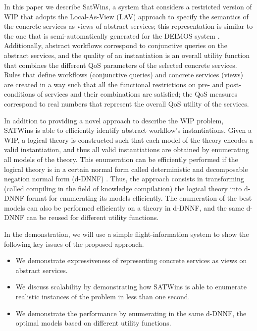 \documentclass{llncs}
\begin{document}
In this paper we describe SatWins, a system that considers
 a restricted version of WIP that adopts
the Local-As-View (LAV) approach \cite{levy:bucket} to specify the semantics of the concrete services as views of abstract services; this representation is similar to the
one that is semi-automatically generated for the DEIMOS system
\cite{AmbiteISWC09}. Additionally,  abstract workflows correspond  to conjunctive
queries on the abstract services, and  the quality
of an instantiation is an overall utility function that combines the
different QoS parameters of the selected concrete services.
Rules that define workflows (conjunctive queries)
and concrete services (views) are created in a way such that all the 
functional restrictions on pre- and post-conditions of services
and their combinations are satisfied; the QoS measures correspond to real numbers that represent the overall QoS utility of the services.

In addition to providing a novel approach to describe the WIP problem, SATWins is able to  efficiently identify abstract workflow's instantiations. 
Given a WIP, a logical theory is constructed such that each model of
the theory encodes a valid instantiation, and thus all valid instantiations
are obtained by enumerating all models of the theory. This enumeration
can be efficiently performed if the logical theory is in a certain 
normal form called deterministic and decomposable negation normal
form (d-DNNF) \cite{darwiche:d-dnnfs}. Thus, the approach consists in
transforming (called compiling in the field of knowledge compilation)
the logical theory into d-DNNF format for enumerating its models efficiently. The  enumeration  of
the best models can also be performed efficiently on a theory in d-DNNF, and the same d-DNNF can be reused for different utility functions.

In the demonstration, we will use a simple flight-information system to show the following key issues of the proposed approach.
\begin{itemize}
\item We demonstrate expressiveness of representing concrete services as views on abstract services.
\item We discuss scalability  by demonstrating how SATWins is able to enumerate realistic instances of the problem in less than one second.
\item We demonstrate the performance  by enumerating in the same d-DNNF, the optimal models based on different utility functions.  

\end{itemize}  
 
\end{document}
